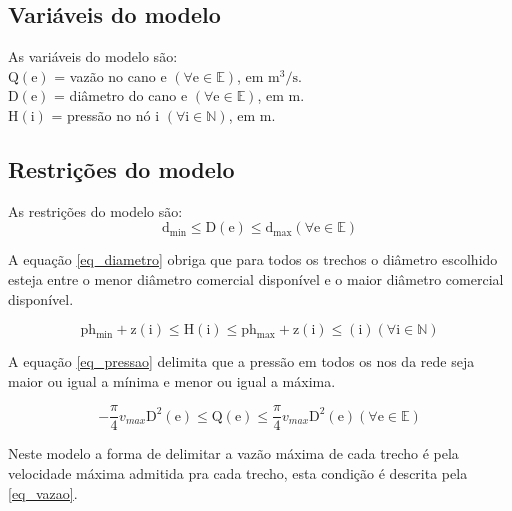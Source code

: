 \documentclass[
	12pt,				%
	openright,			%
	twoside,			%
	a4paper,			%
	english,			%
	french,				%
	spanish,			%
	brazil				%
	]{abntex2}
\newcommand{\setN}{\mathbb{N}}
\newcommand{\setE}{\mathbb{E}}
\newcommand{\edge}{\mathrm{e}}
\newcommand{\inode}{\mathrm{i}}
\newcommand{\dmin}{\mathrm{d_{min}}}
\newcommand{\dmax}{\mathrm{d_{max}}}
\newcommand{\phmin}{\mathrm{ph_{min}}}
\newcommand{\phmax}{\mathrm{ph_{max}}}
\newcommand{\z}{\mathrm{z}}
\newcommand{\vQ}{\mathrm{Q}}
\newcommand{\vH}{\mathrm{H}}
\newcommand{\vD}{\mathrm{D}}
\begin{document}
\subsection{Variáveis do modelo} 
As variáveis do modelo são:\\

\noindent
$\vQ \!\left( \edge \right)$ = vazão no cano $\edge$ $\left(\forall \edge \in \setE \right)$, em $\mathrm{m^{3}/s}$. \\
$\vD \!\left( \edge \right)$ = diâmetro do cano $\edge$ $\left(\forall \edge \in \setE \right)$, em m. \\
$\vH \!\left( \inode \right)$ = pressão no nó $\inode$ $\left(\forall \inode \in \setN \right)$, em m. \\


\subsection{Restrições do modelo}
As restrições do modelo são: \\

\noindent
\begin{equation} \label{eq_diametro}
	\dmin \leq \vD\!\left( \edge \right) \leq \dmax \left(\forall \edge \in \setE \right)
\end{equation}

A equação \ref{eq_diametro} obriga que para todos os trechos o diâmetro escolhido esteja entre o menor diâmetro comercial disponível e o maior diâmetro comercial disponível.

\begin{equation} \label{eq_pressao}
	\phmin + \z\!\left( \inode \right) \leq \vH\!\left( \inode \right) \leq \phmax + \z\!\left( \inode \right) \leq \!\left( \inode \right) \left(\forall \inode \in \setN \right)
\end{equation}

A equação \ref{eq_pressao} delimita que a pressão em todos os nos da rede seja maior ou igual a mínima e menor ou igual a máxima.

\begin{equation} \label{eq_vazao}
	-\dfrac{\pi}{4}v_{max}\vD^{2}\!\left( \edge \right) \leq \vQ\!\left( \edge \right) \leq \dfrac{\pi}{4}v_{max}\vD^{2}\!\left( \edge \right)\left(\forall \edge \in \setE \right)
\end{equation}

Neste modelo a forma de delimitar a vazão máxima de cada trecho é pela velocidade máxima admitida pra cada trecho, esta condição é descrita pela \ref{eq_vazao}.
\end{document}
